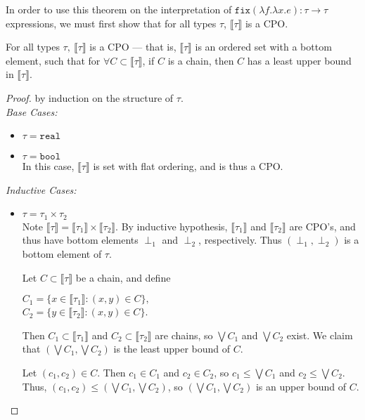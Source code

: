 In order to use this theorem on the interpretation of $\texttt{fix}(\lambda f. \lambda x.e): \tau \rightarrow \tau$ expressions, 
we must first show that for all types $\tau$, $\llbracket \tau \rrbracket$ is a CPO.
\begin{thm}
For all types $\tau, \ \llbracket \tau \rrbracket$ is a CPO --- that is, $\llbracket \tau \rrbracket$ is an ordered 
set with a bottom element, such that for $\forall C \subset \llbracket \tau \rrbracket$, if  $C$ is a chain, then $C$ has a least 
upper bound in $\llbracket \tau \rrbracket$. \\
\end{thm}
\begin{proof}
by induction on the structure of $\tau$. \\
\emph{Base Cases: }
\begin{itemize}
\item $\tau = \texttt{real}$
\item $\tau = \texttt{bool}$ \\
In this case, $\llbracket \tau \rrbracket$ is set with flat ordering, and is thus a CPO. 
\end{itemize}
\emph{Inductive Cases: }
\begin{itemize}
\item $\tau = \tau_1 \times \tau_2$  \\
Note $\llbracket \tau \rrbracket = \llbracket \tau_1 \rrbracket \times \llbracket \tau_2 \rrbracket$. By inductive hypothesis,
$\llbracket \tau_1 \rrbracket$ and $\llbracket \tau_2 \rrbracket$ are CPO's, and thus have bottom elements $\perp_1$ and $
\perp_2$, respectively. Thus $(\perp_1, \perp_2)$ is a bottom element of $\tau$. 

Let $C \subset \llbracket \tau \rrbracket$ be a
chain, and define
\begin{center}
$C_1 = \{x \in \llbracket \tau_1 \rrbracket : (x,y) \in C\},$ \\
$C_2 = \{ y \in \llbracket \tau_2 \rrbracket: (x,y) \in C\}$. \\ 
\end{center}
Then $C_1 \subset \llbracket \tau_1 \rrbracket$ and $C_2 \subset \llbracket \tau_2 \rrbracket$ are chains, so $\bigvee C_1$
and $\bigvee C_2$ exist. We claim that $(\bigvee C_1, \bigvee C_2)$ is the least upper bound of $C$. 

Let $(c_1, c_2) \in C$. Then $c_1 \in C_1$ and $c_2 \in C_2$, so $c_1 \leq \bigvee C_1$ and $c_2 \leq \bigvee C_2$. Thus, 
$(c_1, c_2) \leq (\bigvee C_1, \bigvee C_2)$, so $(\bigvee C_1, \bigvee C_2)$ is an upper bound of $C$.


\end{itemize}
\end{proof}
